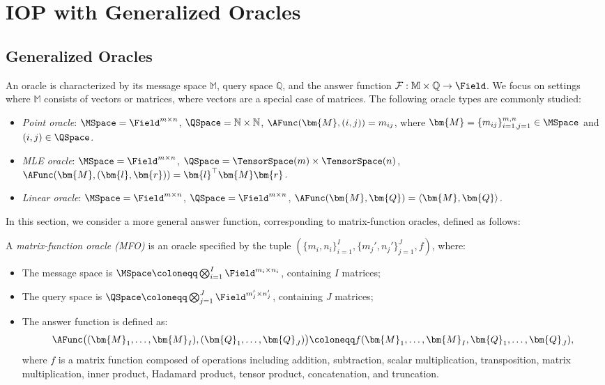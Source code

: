 \section{IOP with Generalized Oracles}
\label{sec:oracle}

\subsection{Generalized Oracles}
\label{sec:oracleSub}

An oracle is characterized by its message space $\mathbb{M}$, query space $\mathbb{Q}$, and the answer function $\mathcal{F} : \mathbb{M} \times \mathbb{Q} \rightarrow \Field$.
We focus on settings where $\mathbb{M}$ consists of vectors or matrices, where vectors are a special case of matrices.
The following oracle types are commonly studied:

\begin{itemize}
    \item \emph{Point oracle}:  
    $\MSpace = \Field^{m \times n}$, $\QSpace = \mathbb{N} \times \mathbb{N}$,  
    $\AFunc(\bm{M}, (i,j)) = m_{ij}$,  
    where $\bm{M} = \{m_{ij}\}_{i=1,j=1}^{m,n} \in \MSpace$ and $(i,j) \in \QSpace$.

    \item \emph{MLE oracle}:  
    $\MSpace = \Field^{m \times n}$, $\QSpace = \TensorSpace(m) \times \TensorSpace(n)$,  
    $\AFunc(\bm{M}, (\bm{l}, \bm{r})) = \bm{l}^\top \bm{M} \bm{r}$.

    \item \emph{Linear oracle}:  
    $\MSpace = \Field^{m \times n}$, $\QSpace = \Field^{m \times n}$,  
    $\AFunc(\bm{M}, \bm{Q}) = \langle \bm{M}, \bm{Q} \rangle$.
\end{itemize}

In this section, we consider a more general answer function,
corresponding to matrix-function oracles, defined as follows:

\begin{definition}
\label{def:matrixOracle}
A \emph{matrix-function oracle (MFO)} is an oracle specified by the tuple
$(\{m_i, n_i\}_{i=1}^I, \{m_j', n_j'\}_{j=1}^J, f)$, where:
\begin{itemize}
    \item The message space is $\MSpace \coloneqq \bigotimes_{i=1}^I \Field^{m_i \times n_i}$, containing $I$ matrices;
    \item The query space is $\QSpace \coloneqq \bigotimes_{j=1}^J \Field^{m_j' \times n_j'}$, containing $J$ matrices;
    \item The answer function is defined as:
    \[
    \AFunc\big((\bm{M}_1, \ldots, \bm{M}_I), (\bm{Q}_1, \ldots, \bm{Q}_J)\big) \coloneqq f(\bm{M}_1, \ldots, \bm{M}_I, \bm{Q}_1, \ldots, \bm{Q}_J),
    \]
    where $f$ is a matrix function composed of operations including addition, subtraction, scalar multiplication, transposition, matrix multiplication, inner product, Hadamard product, tensor product, concatenation, and truncation.
\end{itemize}
\end{definition}


